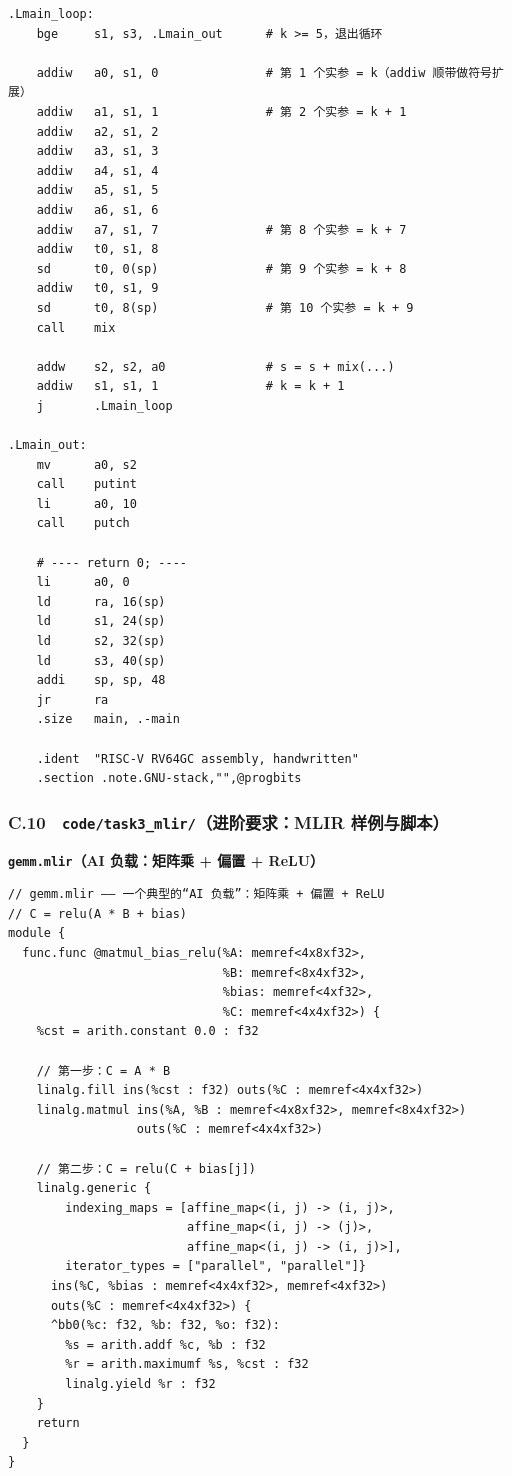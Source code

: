\documentclass[UTF8,a4paper,10pt]{ctexart}
\begin{document}
\begin{lstlisting}[language=riscv]
.Lmain_loop:
    bge     s1, s3, .Lmain_out      # k >= 5，退出循环

    addiw   a0, s1, 0               # 第 1 个实参 = k（addiw 顺带做符号扩展）
    addiw   a1, s1, 1               # 第 2 个实参 = k + 1
    addiw   a2, s1, 2
    addiw   a3, s1, 3
    addiw   a4, s1, 4
    addiw   a5, s1, 5
    addiw   a6, s1, 6
    addiw   a7, s1, 7               # 第 8 个实参 = k + 7
    addiw   t0, s1, 8
    sd      t0, 0(sp)               # 第 9 个实参 = k + 8
    addiw   t0, s1, 9
    sd      t0, 8(sp)               # 第 10 个实参 = k + 9
    call    mix

    addw    s2, s2, a0              # s = s + mix(...)
    addiw   s1, s1, 1               # k = k + 1
    j       .Lmain_loop

.Lmain_out:
    mv      a0, s2
    call    putint
    li      a0, 10
    call    putch

    # ---- return 0; ----
    li      a0, 0
    ld      ra, 16(sp)
    ld      s1, 24(sp)
    ld      s2, 32(sp)
    ld      s3, 40(sp)
    addi    sp, sp, 48
    jr      ra
    .size   main, .-main

    .ident  "RISC-V RV64GC assembly, handwritten"
    .section .note.GNU-stack,"",@progbits\end{lstlisting}


\subsubsection{C.10　\texttt{code/task3\_mlir/}（进阶要求：MLIR 样例与脚本）}


\textbf{\texttt{gemm.mlir}（AI 负载：矩阵乘 + 偏置 + ReLU）}

\begin{lstlisting}[language=MLIR]
// gemm.mlir —— 一个典型的“AI 负载”：矩阵乘 + 偏置 + ReLU
// C = relu(A * B + bias)
module {
  func.func @matmul_bias_relu(%A: memref<4x8xf32>,
                              %B: memref<8x4xf32>,
                              %bias: memref<4xf32>,
                              %C: memref<4x4xf32>) {
    %cst = arith.constant 0.0 : f32

    // 第一步：C = A * B
    linalg.fill ins(%cst : f32) outs(%C : memref<4x4xf32>)
    linalg.matmul ins(%A, %B : memref<4x8xf32>, memref<8x4xf32>)
                  outs(%C : memref<4x4xf32>)

    // 第二步：C = relu(C + bias[j])
    linalg.generic {
        indexing_maps = [affine_map<(i, j) -> (i, j)>,
                         affine_map<(i, j) -> (j)>,
                         affine_map<(i, j) -> (i, j)>],
        iterator_types = ["parallel", "parallel"]}
      ins(%C, %bias : memref<4x4xf32>, memref<4xf32>)
      outs(%C : memref<4x4xf32>) {
      ^bb0(%c: f32, %b: f32, %o: f32):
        %s = arith.addf %c, %b : f32
        %r = arith.maximumf %s, %cst : f32
        linalg.yield %r : f32
    }
    return
  }
}\end{lstlisting}
\end{document}
